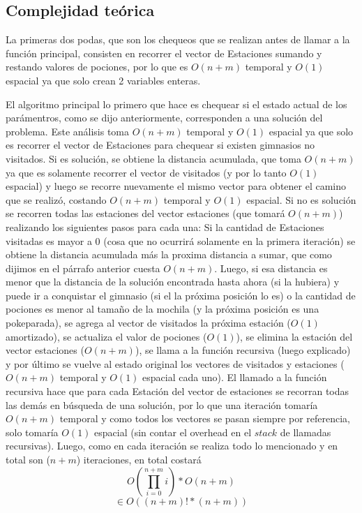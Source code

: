    \subsection{Complejidad teórica}

      La primeras dos podas, que son los chequeos que se realizan antes de llamar a la función principal, consisten en recorrer el vector de Estaciones sumando y restando valores de pociones, por lo que es $O(n+m)$ temporal y $O(1)$ espacial ya que solo crean 2 variables enteras.

      El algoritmo principal lo primero que hace es chequear si el estado actual de los parámentros, como se dijo anteriormente, corresponden a una solución del problema. Este análisis toma $O(n+m)$ temporal y $O(1)$ espacial ya que solo es recorrer el vector de Estaciones para chequear si existen gimnasios no visitados. Si es solución, se obtiene la distancia acumulada, que toma $O(n+m)$ ya que es solamente recorrer el vector de visitados (y por lo tanto $O(1)$ espacial) y luego se recorre nuevamente el mismo vector para obtener el camino que se realizó, costando $O(n+m)$ temporal y $O(1)$ espacial.
      Si no es solución se recorren todas las estaciones del vector estaciones (que tomará $O(n+m)$) realizando los siguientes pasos para cada una: Si la cantidad de Estaciones visitadas es mayor a 0 (cosa que no ocurrirá solamente en la primera iteración) se obtiene la distancia acumulada más la proxima distancia a sumar, que como dijimos en el párrafo anterior cuesta $O(n+m)$. Luego, si esa distancia es menor que la distancia de la solución encontrada hasta ahora (si la hubiera) y puede ir a conquistar el gimnasio (si el la próxima posición lo es) o la cantidad de pociones es menor al tamaño de la mochila (y la próxima posición es una pokeparada), se agrega al vector de visitados la próxima estación ($O(1)$ amortizado), se actualiza el valor de pociones ($O(1)$), se elimina la estación del vector estaciones ($O(n+m)$), se llama a la función recursiva (luego explicado) y por último se vuelve al estado original los vectores de visitados y estaciones ($O(n+m)$ temporal y $O(1)$ espacial cada uno).
      El llamado a la función recursiva hace que para cada Estación del vector de estaciones se recorran todas las demás en búsqueda de una solución, por lo que una iteración tomaría $O(n+m)$ temporal y como todos los vectores se pasan siempre por referencia, solo tomaría $O(1)$ espacial (sin contar el overhead en el $stack$ de llamadas recursivas). Luego, como en cada iteración se realiza todo lo mencionado y en total son ($n+m$) iteraciones, en total costará
      \[
        O(\prod_{i=0}^{n+m} i)*O(n+m)
      \]
      \[
        \in O((n+m)! * (n+m))
      \]

